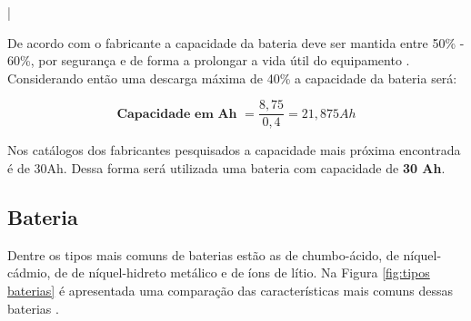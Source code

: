 |%

De acordo com o fabricante a capacidade da bateria deve ser mantida entre 50\% - 60\%, por segurança e de forma a prolongar a vida útil do equipamento \cite{datasheet_bateria}. Considerando então uma descarga máxima de 40\% a capacidade da bateria será:
\begin{center}
\begin{equation}
\textbf{Capacidade em Ah } = \frac{8,75} {0,4} = 21,875 Ah
\end{equation}
\end{center}

Nos catálogos dos fabricantes pesquisados a capacidade mais próxima encontrada é de 30Ah.
Dessa forma será utilizada uma bateria com capacidade de \textbf {30 Ah}.

\subsection{Bateria}

Dentre os tipos mais comuns de baterias estão as de chumbo-ácido, de níquel-cádmio, de de níquel-hidreto metálico e de íons de lítio. Na Figura \ref{fig:tipos baterias} é apresentada uma comparação das características mais comuns dessas baterias \cite{artigo_bateria}.

